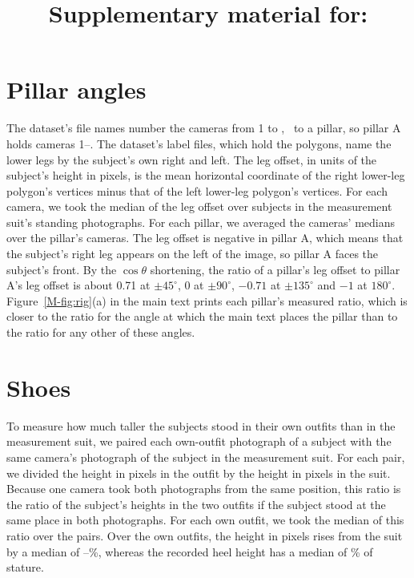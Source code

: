 \documentclass[12pt]{article}
\title{Supplementary material for: \papertitle}
\date{}
\begin{document}
\maketitle

\section{Pillar angles}\label{sec:rigangles}

The dataset's file names number the cameras from 1 to \camerasTotal, \camerasPerPillar\ to a pillar, so pillar A
holds cameras 1--\camerasPerPillar. The dataset's label files, which hold the polygons, name the lower legs by the subject's own right and left. The leg offset,
in units of the subject's height in pixels, is the mean horizontal coordinate of the right lower-leg polygon's
vertices minus that of the left lower-leg polygon's vertices. For each camera, we took the median of the leg offset over subjects in the measurement
suit's standing photographs. For each pillar, we averaged the cameras' medians over the pillar's cameras. The leg
offset is negative in pillar A, which means that the subject's right leg appears on the left of the image, so pillar A
faces the subject's front. By the $\cos\theta$ shortening, the ratio of a pillar's leg offset to pillar A's leg offset
is about 0.71 at $\pm45^\circ$, 0 at $\pm90^\circ$, $-0.71$ at $\pm135^\circ$ and $-1$ at $180^\circ$.
Figure~\ref{M-fig:rig}(a) in the main text prints each pillar's measured ratio, which is closer to the ratio for the angle at which the main text places the
pillar than to the ratio for any other of these angles.

\section{Shoes}\label{sec:shoes}

To measure how much taller the subjects stood in their own outfits than in the measurement suit, we paired each own-outfit photograph of a subject with the same camera's
photograph of the subject in the measurement suit. For each pair, we divided the height in pixels in the outfit by the height in pixels in the suit. Because one camera took both photographs from the same position, this ratio is the ratio of the subject's heights in the two outfits if the
subject stood at the same place in both photographs. For each own outfit, we took the median of this ratio over the pairs. Over the own
outfits, the height in pixels rises from the suit by a median of \statureGainMin--\statureGainMax\%, whereas the
recorded heel height has a median of \heelShareMedian\% of stature. 
\end{document}
